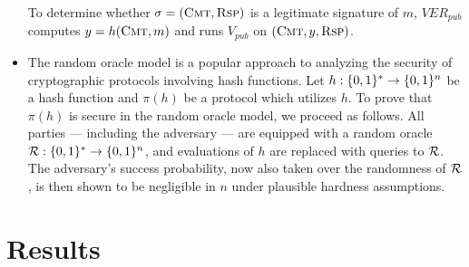 \documentclass[12pt,twoside]{article}
\begin{document}
\begin{itemize}
\medskip\noindent
To determine whether $\sigma = (\textsc{Cmt},\textsc{Rsp})$ 
is a legitimate signature of $m$, $VER_{pub}$ computes 
$y = h(\textsc{Cmt},m)$ and runs $V_{pub}$ on $(\textsc{Cmt},y,\textsc{Rsp})$. 

\item The random oracle model is a popular approach to analyzing the security
of cryptographic protocols involving hash functions. Let $h: \{0,1\}^{*} \to
\{0,1\}^{n}$ be a hash function and $\pi(h)$ be a protocol which utilizes $h$.
To prove that $\pi(h)$ is secure in 
the random oracle model, we proceed as follows. All parties --- including the 
adversary --- are equipped with a random oracle $\mathcal{R} : \{0,1\}^{*} \to 
\{0,1\}^{n}$, and evaluations of $h$ are replaced with queries to $\mathcal{R}$. The 
adversary's success probability, now also taken over the randomness of $\mathcal{R}$,
is then shown to be negligible in $n$ under plausible hardness assumptions.
\end{itemize}

\section*{Results}
\end{document}
